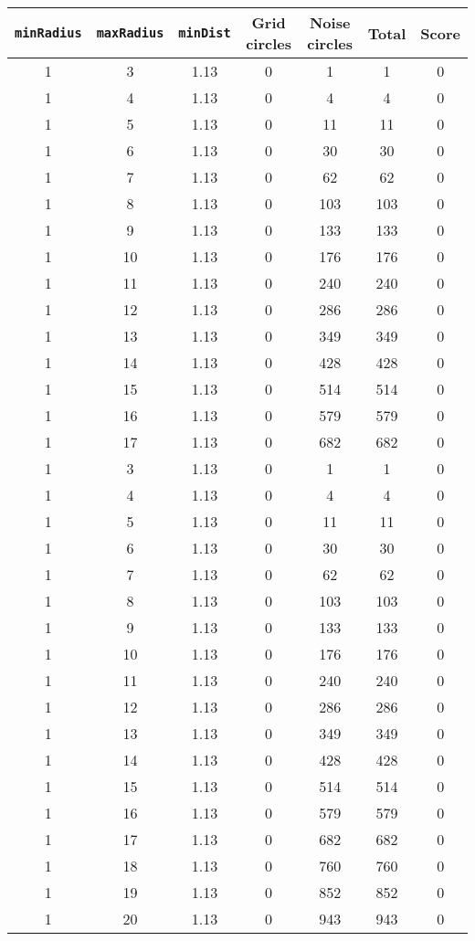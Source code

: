 \documentclass[letterpaper, 12pt]{article}
\begin{document}
\begin{longtable}{|c|c|c|c|c|c|c|}
\hline
\textbf{\texttt{minRadius}} & \textbf{\texttt{maxRadius}} & \textbf{\texttt{minDist}} & \textbf{Grid circles} & \textbf{Noise circles} & \textbf{Total} & \textbf{Score} \\
\hline
1 & 3 & 1.13 & 0 & 1 & 1 & 0 \\
\hline
1 & 4 & 1.13 & 0 & 4 & 4 & 0 \\
\hline
1 & 5 & 1.13 & 0 & 11 & 11 & 0 \\
\hline
1 & 6 & 1.13 & 0 & 30 & 30 & 0 \\
\hline
1 & 7 & 1.13 & 0 & 62 & 62 & 0 \\
\hline
1 & 8 & 1.13 & 0 & 103 & 103 & 0 \\
\hline
1 & 9 & 1.13 & 0 & 133 & 133 & 0 \\
\hline
1 & 10 & 1.13 & 0 & 176 & 176 & 0 \\
\hline
1 & 11 & 1.13 & 0 & 240 & 240 & 0 \\
\hline
1 & 12 & 1.13 & 0 & 286 & 286 & 0 \\
\hline
1 & 13 & 1.13 & 0 & 349 & 349 & 0 \\
\hline
1 & 14 & 1.13 & 0 & 428 & 428 & 0 \\
\hline
1 & 15 & 1.13 & 0 & 514 & 514 & 0 \\
\hline
1 & 16 & 1.13 & 0 & 579 & 579 & 0 \\
\hline
1 & 17 & 1.13 & 0 & 682 & 682 & 0 \\
\hline
1 & 3 & 1.13 & 0 & 1 & 1 & 0 \\
\hline
1 & 4 & 1.13 & 0 & 4 & 4 & 0 \\
\hline
1 & 5 & 1.13 & 0 & 11 & 11 & 0 \\
\hline
1 & 6 & 1.13 & 0 & 30 & 30 & 0 \\
\hline
1 & 7 & 1.13 & 0 & 62 & 62 & 0 \\
\hline
1 & 8 & 1.13 & 0 & 103 & 103 & 0 \\
\hline
1 & 9 & 1.13 & 0 & 133 & 133 & 0 \\
\hline
1 & 10 & 1.13 & 0 & 176 & 176 & 0 \\
\hline
1 & 11 & 1.13 & 0 & 240 & 240 & 0 \\
\hline
1 & 12 & 1.13 & 0 & 286 & 286 & 0 \\
\hline
1 & 13 & 1.13 & 0 & 349 & 349 & 0 \\
\hline
1 & 14 & 1.13 & 0 & 428 & 428 & 0 \\
\hline
1 & 15 & 1.13 & 0 & 514 & 514 & 0 \\
\hline
1 & 16 & 1.13 & 0 & 579 & 579 & 0 \\
\hline
1 & 17 & 1.13 & 0 & 682 & 682 & 0 \\
\hline
1 & 18 & 1.13 & 0 & 760 & 760 & 0 \\
\hline
1 & 19 & 1.13 & 0 & 852 & 852 & 0 \\
\hline
1 & 20 & 1.13 & 0 & 943 & 943 & 0 \\
\hline
\end{longtable}
\end{document}
